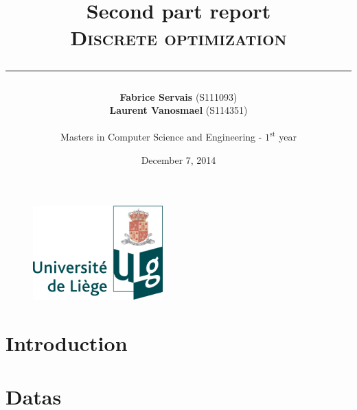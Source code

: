 \documentclass[a4paper,titlepage]{article}
\begin{document}
\begin{titlepage}

\begin{figure}
\centering
\includegraphics[width=5cm]{logo-ulg.png}
\end{figure}



\title{
\vspace{0.2cm}
\LARGE{\textbf{Second part report}} \\ \textsc{Discrete optimization}
\author{\textbf{Fabrice Servais} \small{(S111093})\\\textbf{Laurent Vanosmael} \small{(S114351}) \\ \\ Masters in Computer Science and Engineering - $1^{\text{st}}$ year}
\date{December 7, 2014}
\rule{15cm}{1.5pt}
}

\end{titlepage}

\pagestyle{fancy}

\maketitle

\section{Introduction}



\section{Datas}
\end{document}
